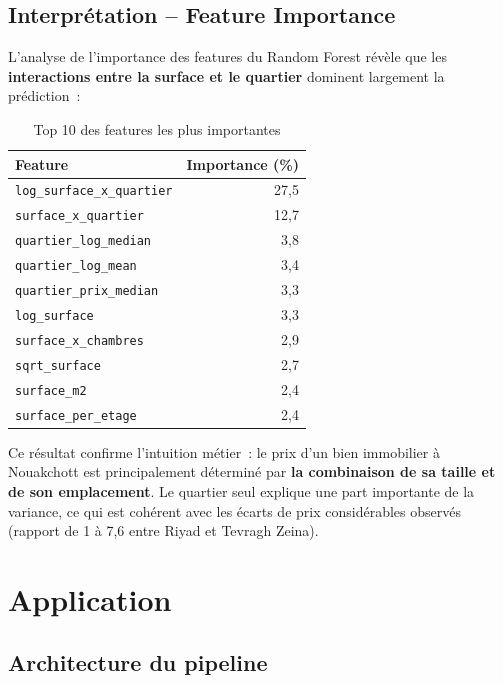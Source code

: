 \documentclass[12pt, a4paper]{article}
\begin{document}
\subsection{Interprétation -- Feature Importance}

L'analyse de l'importance des features du Random Forest révèle que les \textbf{interactions entre la surface et le quartier} dominent largement la prédiction~:

\begin{table}[H]
\centering
\caption{Top 10 des features les plus importantes}
\label{tab:feature_importance}
\begin{tabular}{lr}
\toprule
\textbf{Feature} & \textbf{Importance (\%)} \\
\midrule
\texttt{log\_surface\_x\_quartier} & 27,5 \\
\texttt{surface\_x\_quartier} & 12,7 \\
\texttt{quartier\_log\_median} & 3,8 \\
\texttt{quartier\_log\_mean} & 3,4 \\
\texttt{quartier\_prix\_median} & 3,3 \\
\texttt{log\_surface} & 3,3 \\
\texttt{surface\_x\_chambres} & 2,9 \\
\texttt{sqrt\_surface} & 2,7 \\
\texttt{surface\_m2} & 2,4 \\
\texttt{surface\_per\_etage} & 2,4 \\
\bottomrule
\end{tabular}
\end{table}

Ce résultat confirme l'intuition métier~: le prix d'un bien immobilier à Nouakchott est principalement déterminé par \textbf{la combinaison de sa taille et de son emplacement}. Le quartier seul explique une part importante de la variance, ce qui est cohérent avec les écarts de prix considérables observés (rapport de 1 à 7,6 entre Riyad et Tevragh Zeina).

\section{Application}

\subsection{Architecture du pipeline}
\end{document}
